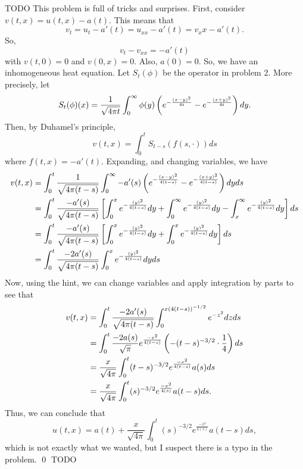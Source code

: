 \documentclass{article}
\begin{document}
\newpage
{} TODO
 \tri
\hop 
\solution
This problem is full of tricks and surprises. First, consider $v(t,x) = u(t,x) - a(t)$. This means that 
\[v_t = u_t - a'(t) = u_{xx} - a'(t)= v_xx - a'(t).\]
So, 
\[v_t - v_{xx} = -a'(t)\]
with $v(t,0)= 0$ and $v(0,x) = 0$. Also, $a(0)= 0$. So, we have an inhomogeneous heat equation.
\hop 
Let $S_t(\phi)$ be the operator in problem 2. More precisely, let 
\[S_t(\phi)(x) = \frac{1}{\sqrt{4\pi t}} \int_0^\infty \phi(y)\del{e^{-\frac{(x-y)^2}{4t}} - e^{-\frac{(x+y)^2}{4t}}}dy.\] 
Then, by Duhamel's principle, 
\[v(t,x) = \int_0^tS_{t-s}(f(s, \cdot))ds\]
where $f(t,x) = -a'(t)$. Expanding, and changing variables, we have 
\begin{align*}
    v(t,x) &= \int_0^t \frac{1}{\sqrt{4\pi (t-s)}} \int_0^\infty -a'(s)\del{e^{-\frac{(x-y)^2}{4(t-s)}} - e^{-\frac{(x+y)^2}{4(t-s)}}}dy ds \\
    &= \int_0^t \frac{-a'(s)}{\sqrt{4\pi (t-s)}} \sbr{\int_0^x e^{-\frac{(y)^2}{4(t-s)}}dy+\int_0^\infty e^{-\frac{(y)^2}{4(t-s)}}dy-\int_x^\infty e^{-\frac{(y)^2}{4(t-s)}}dy} ds\\
    &= \int_0^t \frac{-a'(s)}{\sqrt{4\pi (t-s)}} \sbr{\int_0^x e^{-\frac{(y)^2}{4(t-s)}}dy+\int_0^x e^{-\frac{(y)^2}{4(t-s)}}dy} ds\\
    &= \int_0^t \frac{-2a'(s)}{\sqrt{4\pi (t-s)}}\int_0^x e^{-\frac{(y)^2}{4(t-s)}}dy ds
\end{align*}
Now, using the hint, we can change variables and apply integration by parts to see that 
\begin{align*}
    v(t,x) &=  \int_0^t \frac{-2a'(s)}{\sqrt{4\pi (t-s)}}\int_0^{x(4(t-s))^{-1/2}} e^{-z^2}dz ds\\
    &=  \int_0^t \frac{-2a(s)}{\sqrt{\pi}} e^{\frac{-x^2}{4(t-s)}} \del{-(t-s)^{-3/2} \cdot \frac{1}{4}} ds\\
    &=  \frac{x}{\sqrt{4\pi}}\int_0^t (t-s)^{-3/2} e^{\frac{-x^2}{4(t-s)}}a(s) ds\\
    &=  \frac{x}{\sqrt{4\pi}}\int_0^t (s)^{-3/2} e^{\frac{-x^2}{4(s)}}a(t-s) ds.
\end{align*}
Thus, we can conclude that 
\[u(t,x)= a(t) + \frac{x}{\sqrt{4\pi}}\int_0^t (s)^{-3/2} e^{\frac{-x^2}{4(s)}}a(t-s) ds,\]
which is not exactly what we wanted, but I suspect there is a typo in the problem. \qed
\newpage
{} TODO
 \tri
\hop 
\solution
\end{document}
